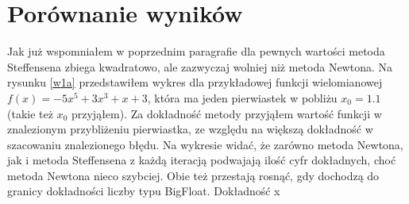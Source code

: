 \documentclass{article}
\begin{document}
\section{Porównanie wyników}
Jak już wspomniałem w poprzednim paragrafie dla pewnych wartości metoda Steffensena zbiega kwadratowo, ale zazwyczaj wolniej niż metoda Newtona. Na rysunku \ref{w1a} przedstawiłem wykres dla przykładowej funkcji wielomianowej $f(x)=-5x^5+3x^3+x+3$, która ma jeden pierwiastek w pobliżu $x_0=1.1$ (takie też $x_0$ przyjąłem). Za dokładność metody przyjąłem wartość funkcji w znalezionym przybliżeniu pierwiastka, ze względu na większą dokładność w szacowaniu znalezionego błędu. Na wykresie widać, że zarówno metoda Newtona, jak i metoda Steffensena z każdą iteracją podwajają ilość cyfr dokładnych, choć metoda Newtona nieco szybciej. Obie też przestają rosnąć, gdy dochodzą do granicy dokładności liczby typu BigFloat. Dokładność x 
\end{document}
